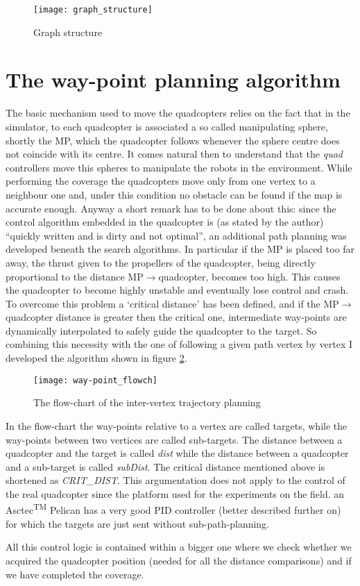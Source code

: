 \begin{figure}[H]
\centering
\texttt{[image: graph\_structure]}
\caption{Graph structure}
\label{fig:graph_struct}
\end{figure}


\section{The way-point planning algorithm}

The basic mechanism used to move the quadcopters relies on the fact that in the simulator, to each quadcopter is associated a so called manipulating sphere, shortly the MP, which the quadcopter follows whenever the sphere centre does not coincide with its centre. It comes natural then to understand that the \emph{quad} controllers move this spheres to manipulate the robots in the environment. 
While performing the coverage the quadcopters move only from one vertex to a neighbour one and, under this condition no obstacle can be found if the map is accurate enough. Anyway a short remark has to be done about this: since the control algorithm embedded in the quadcopter is (as stated by the author) ``quickly written and is dirty and not optimal'', an additional path planning was developed beneath the search algorithms.
In particular if the MP is placed too far away, the thrust given to the propellers of the quadcopter, being directly proportional to the distance MP$\rightarrow$quadcopter, becomes too high. This causes the quadcopter to become highly unstable and eventually lose control and crash. To overcome this problem a `critical distance' has been defined, and if the MP$\rightarrow$quadcopter distance is greater then the critical one, intermediate way-points are dynamically interpolated to safely guide the quadcopter to the target.
So combining this necessity with the one of following a given path vertex by vertex I developed the algorithm shown in figure \ref{fig:wp_flowch}.


\begin{figure}[t]
\centering
\texttt{[image: way-point\_flowch]}
\caption{The flow-chart of the inter-vertex trajectory planning}
\label{fig:wp_flowch}
\end{figure}

In the flow-chart the way-points relative to a vertex are called targets, while the \mbox{way-points} between two vertices are called sub-targets. The distance between a quadcopter and the target is called \textit{dist} while the distance between a quadcopter and a sub-target is called \textit{subDist}. The critical distance mentioned above is shortened as \textit{CRIT\_DIST}.
This argumentation does not apply to the control of the real quadcopter since the platform used for the experiments on the field. an Asctec\textsuperscript{TM} Pelican has a very good PID controller (better described further on) for which the targets are just sent without sub-path-planning.

All this control logic is contained within a bigger one where we check whether we acquired the quadcopter position (needed for all the distance comparisons) and if we have completed the coverage.
